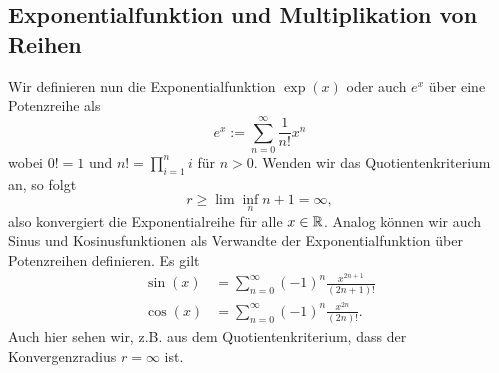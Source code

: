 \subsection{Exponentialfunktion und Multiplikation von Reihen}
\label{\detokenize{metrik/potenzreihen:exponentialfunktion-und-multiplikation-von-reihen}}
Wir definieren nun die Exponentialfunktion \(\exp(x)\) oder auch \(e^x\) über eine Potenzreihe als
\begin{equation*}
 e^x:= \sum_{n=0}^\infty \frac{1}{n!} x^n
\end{equation*}
wobei \(0!=1\) und \(n! = \prod_{i=1}^n i\) für \(n > 0\). Wenden wir das Quotientenkriterium an, so folgt
\begin{equation*}
 r \geq \lim\inf_n n+1 = \infty,
\end{equation*}
also konvergiert die Exponentialreihe für alle \(x \in \mathbb{R}\).
Analog können wir auch Sinus  und Kosinusfunktionen als Verwandte der Exponentialfunktion über Potenzreihen definieren. Es gilt
\begin{align*}
\sin(x) &= \sum_{n=0}^\infty (-1)^n \frac{x^{2n+1}}{(2n+1)!} \\
\cos(x) &= \sum_{n=0}^\infty (-1)^n \frac{x^{2n }}{(2n )!}.
\end{align*}
Auch hier sehen wir, z.B. aus dem Quotientenkriterium, dass der Konvergenzradius \(r=\infty\) ist.


